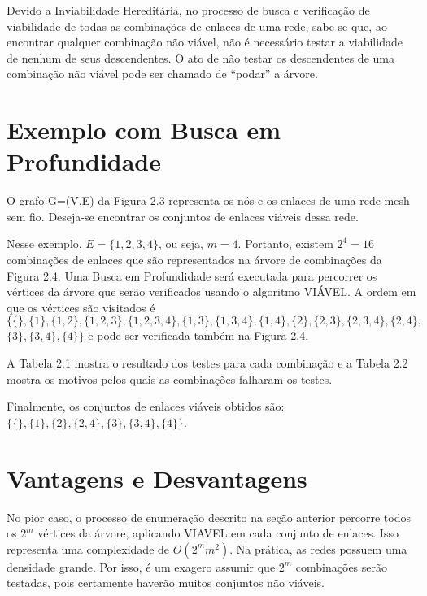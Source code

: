 Devido a Inviabilidade Hereditária, no processo de busca e verificação de viabilidade de todas as combinações de enlaces de uma rede, sabe-se que, ao encontrar qualquer combinação não viável, não é necessário testar a viabilidade de nenhum de seus descendentes. O ato de não testar os descendentes de uma combinação não viável pode ser chamado de ``podar'' a árvore. 

\section{Exemplo com Busca em Profundidade}

O grafo G=(V,E) da Figura 2.3 representa os nós e os enlaces de uma rede mesh sem fio. Deseja-se encontrar os conjuntos de enlaces viáveis dessa rede. 


Nesse exemplo, $E=\{1, 2, 3, 4\}$, ou seja, $m=4$. Portanto, existem $2^4 = 16$ combinações de enlaces que são representados na árvore de combinações da Figura 2.4. Uma Busca em Profundidade será executada para percorrer os vértices da árvore que serão verificados usando o algoritmo VIÁVEL. A ordem em que os vértices são visitados é $\{\{\}, \{1\}, \{1,2\}, \{1,2,3\}, \{1,2,3,4\}, \{1,3\}, \{1,3,4\}, \{1,4\}, \{2\}, \{2,3\}, \{2,3,4\}, \{2,4\},$ $\{3\}, \{3,4\}, \{4\}\}$ e pode ser verificada também na Figura 2.4.


A Tabela 2.1 mostra o resultado dos testes para cada combinação e a Tabela 2.2 mostra os motivos pelos quais as combinações falharam os testes.



Finalmente, os conjuntos de enlaces viáveis obtidos  são: $\{\{\},\{1\},\{2\},\{2,4\},\{3\},\{3,4\},\{4\}\}$. 

\section{Vantagens e Desvantagens}

No pior caso, o processo de enumeração descrito na seção anterior percorre todos os $2^m$ vértices da árvore, aplicando VIAVEL em cada conjunto de enlaces. Isso representa uma complexidade de $O(2^mm^2)$. Na prática, as redes possuem uma densidade grande. Por isso, é um exagero assumir que $2^m$ combinações serão testadas, pois certamente haverão muitos conjuntos não viáveis. 

